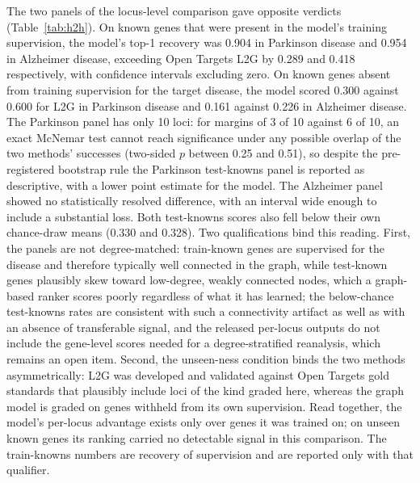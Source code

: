 \documentclass[11pt]{article}
\begin{document}
The two panels of the locus-level comparison gave opposite verdicts (Table~\ref{tab:h2h}). On known genes that were present in the model's training supervision, the model's top-1 recovery was 0.904 in Parkinson disease and 0.954 in Alzheimer disease, exceeding Open Targets L2G by 0.289 and 0.418 respectively, with confidence intervals excluding zero. On known genes absent from training supervision for the target disease, the model scored 0.300 against 0.600 for L2G in Parkinson disease and 0.161 against 0.226 in Alzheimer disease. The Parkinson panel has only 10 loci: for margins of 3 of 10 against 6 of 10, an exact McNemar test cannot reach significance under any possible overlap of the two methods' successes (two-sided $p$ between 0.25 and 0.51), so despite the pre-registered bootstrap rule the Parkinson test-knowns panel is reported as descriptive, with a lower point estimate for the model. The Alzheimer panel showed no statistically resolved difference, with an interval wide enough to include a substantial loss. Both test-knowns scores also fell below their own chance-draw means (0.330 and 0.328). Two qualifications bind this reading. First, the panels are not degree-matched: train-known genes are supervised for the disease and therefore typically well connected in the graph, while test-known genes plausibly skew toward low-degree, weakly connected nodes, which a graph-based ranker scores poorly regardless of what it has learned; the below-chance test-knowns rates are consistent with such a connectivity artifact as well as with an absence of transferable signal, and the released per-locus outputs do not include the gene-level scores needed for a degree-stratified reanalysis, which remains an open item. Second, the unseen-ness condition binds the two methods asymmetrically: L2G was developed and validated against Open Targets gold standards that plausibly include loci of the kind graded here, whereas the graph model is graded on genes withheld from its own supervision. Read together, the model's per-locus advantage exists only over genes it was trained on; on unseen known genes its ranking carried no detectable signal in this comparison. The train-knowns numbers are recovery of supervision and are reported only with that qualifier.
\end{document}
